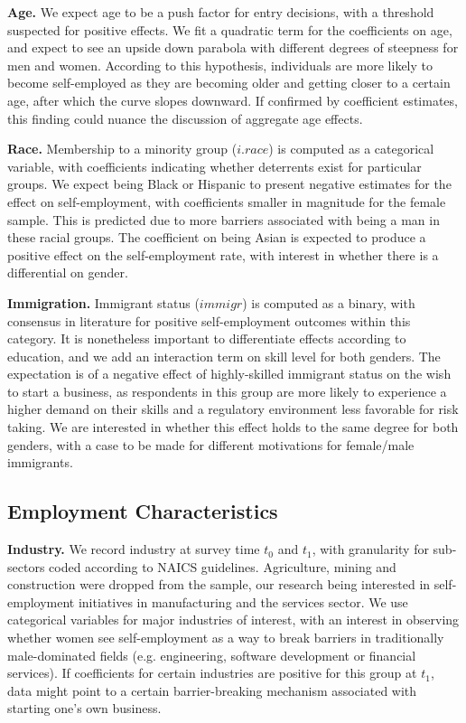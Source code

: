 \textbf{Age.} We expect age to be a push factor for entry decisions, with a threshold suspected for positive effects. We fit a quadratic term for the coefficients on age, and expect to see an upside down parabola with different degrees of steepness for men and women. According to this hypothesis, individuals are more likely to become self-employed as they are becoming older and getting closer to a certain age, after which the curve slopes downward. If confirmed by coefficient estimates, this finding could nuance the discussion of aggregate age effects. 

\textbf{Race.} Membership to a minority group ($i.race$) is computed as a categorical variable, with coefficients indicating whether deterrents exist for particular groups. We expect being Black or Hispanic to present negative estimates for the effect on self-employment, with coefficients smaller in magnitude for the female sample. This is predicted due to more barriers associated with being a man in these racial groups. The coefficient on being Asian is expected to produce a positive effect on the self-employment rate, with interest in whether there is a differential on gender. 


\textbf{Immigration.} Immigrant status ($immigr$) is computed as a binary, with consensus in literature for positive self-employment outcomes within this category. It is nonetheless important to differentiate effects according to education, and we add an interaction term on skill level for both genders. The expectation is of a negative effect of highly-skilled immigrant status on the wish to start a business, as respondents in this group are more likely to experience a higher demand on their skills and a regulatory environment less favorable for risk taking. We are interested in whether this effect holds to the same degree for both genders, with a case to be made for different motivations for female/male immigrants. 


\subsection{Employment Characteristics}

\textbf{Industry.} We record industry at survey time $t_0$ and $t_1$, with granularity for sub-sectors coded according to NAICS guidelines. Agriculture, mining and construction were dropped from the sample, our research being interested in self-employment initiatives in manufacturing and the services sector. We use categorical variables for major industries of interest, with an interest in observing whether women see self-employment as a way to break barriers in traditionally male-dominated fields (e.g. engineering, software development or financial services). If coefficients for certain industries are positive for this group at $t_1$, data might point to a certain barrier-breaking mechanism associated with starting one's own business. 

